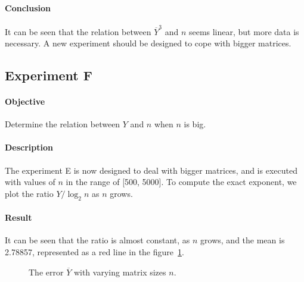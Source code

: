 \documentclass[11pt,a4paper]{article}
\begin{document}
\paragraph{Conclusion}
It can be seen that the relation between $\overline Y^3$ and $n$ seems linear, 
but more data is necessary. A new experiment should be designed to cope with 
bigger matrices.

\newpage
\subsection*{Experiment F}

\paragraph{Objective}
Determine the relation between $Y$ and $n$ when $n$ is big.

\paragraph{Description}
The experiment E is now designed to deal with bigger matrices, and is executed 
with values of $n$ in the range of [500, 5000].  To compute the exact exponent, 
we plot the ratio $Y/\log_2 n$ as $n$ grows.

\paragraph{Result}
It can be seen that the ratio is almost constant, as $n$ grows, and the mean is 
2.78857, represented as a red line in the figure~\ref{fig:expF}.
\begin{figure}[h]
	\caption{The error $\overline Y$ with varying matrix sizes $n$.}
	\label{fig:expF}
\end{figure}
\end{document}
